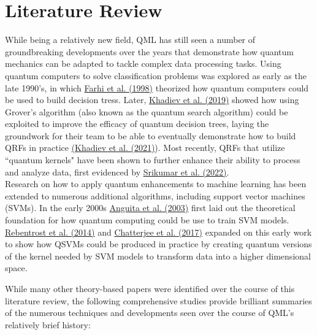 \documentclass[11pt, oneside]{article}   	%
\begin{document}
\section{Literature Review}

\noindent\hspace{10mm}While being a relatively new field, QML has still seen a number of groundbreaking developments over the years that demonstrate how quantum mechanics can be adapted to tackle complex data processing tasks. Using quantum computers to solve classification problems was explored as early as the late 1990's, in which \href{https://arxiv.org/abs/quant-ph/9706062}{Farhi et al. (1998)} theorized how quantum computers could be used to build decision tress. Later, \href{https://arxiv.org/abs/1907.06840}{Khadiev et al. (2019)} showed how using Grover's algorithm (also known as the quantum search algorithm) could be exploited to improve the efficacy of quantum decision trees, laying the groundwork for their team to be able to eventually demonstrate how to build QRFs in practice \href{https://arxiv.org/abs/2112.13346}{(Khadiev et al. (2021)}). Most recently, QRFs that utilize ``quantum kernels" have been shown to further enhance their ability to process and analyze data, first evidenced by \href{https://arxiv.org/abs/2210.02355}{Srikumar et al. (2022)}. \\

\noindent\hspace{10mm}Research on how to apply quantum enhancements to machine learning has been extended to numerous additional algorithms, including support vector machines (SVMs). In the early 2000s \href{https://members.cbio.mines-paristech.fr/~jvert/svn/bibli/local/Anguita2003Quantum.pdf}{Anguita et al. (2003)} first laid out the theoretical foundation for how quantum computing could be use to train SVM models. \href{https://arxiv.org/abs/1307.0471}{Rebentrost et al. (2014)} and \href{https://arxiv.org/abs/1612.03713}{Chatterjee et al. (2017)} expanded on this early work to show how QSVMs could be produced in practice by creating quantum versions of the kernel needed by SVM models to transform data into a higher dimensional space. 

\noindent\hspace{10mm} While many other theory-based papers were identified over the course of this literature review, the following comprehensive studies provide brilliant summaries of the numerous techniques and developments seen over the course of QML's relatively brief history: 
\end{document}

